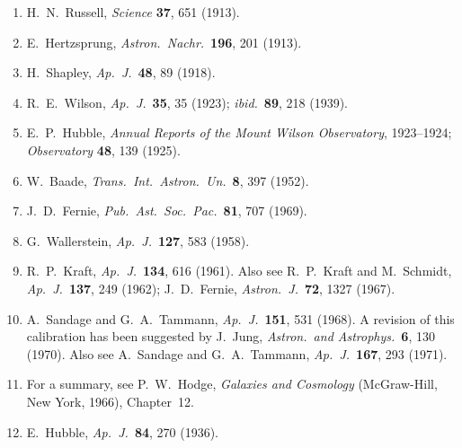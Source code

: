 \begin{enumerate}
  \item{}\label{ch14-ref-22}
  H.~N.~Russell, \emph{Science} \textbf{37}, 651 (1913).

  \item{}\label{ch14-ref-23}
  E.~Hertzsprung, \emph{Astron.\ Nachr.}\ \textbf{196}, 201 (1913).

  \item{}\label{ch14-ref-24}
  H.~Shapley, \emph{Ap.\ J.}\ \textbf{48}, 89 (1918).

  \item{}\label{ch14-ref-25}
  R.~E.~Wilson, \emph{Ap.\ J.}\ \textbf{35}, 35 (1923);
  \emph{ibid.}\ \textbf{89}, 218 (1939).

  \item{}\label{ch14-ref-26}
  E.~P.~Hubble, \emph{Annual Reports of the Mount Wilson Observatory},
  1923--1924; \emph{Observatory} \textbf{48}, 139 (1925).

  \item{}\label{ch14-ref-27}
  W.~Baade, \emph{Trans.\ Int.\ Astron.\ Un.}\ \textbf{8}, 397 (1952).

  \item{}\label{ch14-ref-28}
  J.~D.~Fernie, \emph{Pub.\ Ast.\ Soc.\ Pac.}\ \textbf{81}, 707 (1969).

  \item{}\label{ch14-ref-29}
  G.~Wallerstein, \emph{Ap.\ J.}\ \textbf{127}, 583 (1958).

  \item{}\label{ch14-ref-30}
  R.~P.~Kraft, \emph{Ap.\ J.}\ \textbf{134}, 616 (1961).
  Also see R.~P.~Kraft and M.~Schmidt,
  \emph{Ap.\ J.}\ \textbf{137}, 249 (1962);
  J.~D.~Fernie, \emph{Astron.\ J.}\ \textbf{72}, 1327 (1967).

  \item{}\label{ch14-ref-31}
  A.~Sandage and G.~A.~Tammann,
  \emph{Ap.\ J.}\ \textbf{151}, 531 (1968).
  A revision of this calibration has been suggested by J.~Jung,
  \emph{Astron.\ and Astrophys.}\ \textbf{6}, 130 (1970).
  Also see A.~Sandage and G.~A.~Tammann,
  \emph{Ap.\ J.}\ \textbf{167}, 293 (1971).

  \item{}\label{ch14-ref-32}
  For a summary, see P.~W.~Hodge, \emph{Galaxies and Cosmology}
  (McGraw-Hill, New York, 1966), Chapter~12.

  \item{}\label{ch14-ref-33}
  E.~Hubble, \emph{Ap.\ J.}\ \textbf{84}, 270 (1936).


\end{enumerate}
